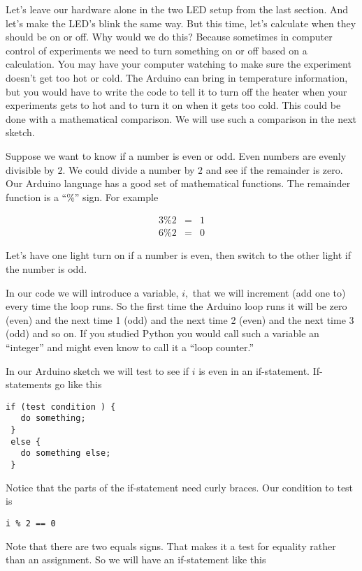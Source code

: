 Let's leave our hardware alone in the two LED setup from the last section. And let's make the LED's blink the same way. But this time, let's calculate when they should be on or off. Why would we do this? Because sometimes in computer control of experiments we need to turn something on or off based on a calculation. You may have your computer watching to make sure the experiment doesn't get too hot or cold. The Arduino can bring in temperature information, but you would have to write the code to tell it to turn off the heater when your experiments gets to hot and to turn it on when it gets too cold. This could be done with a mathematical comparison. We will use such a comparison in the next sketch.

Suppose we want to know if a number is even or odd. Even numbers are evenly divisible by $2.$ We could divide a number by $2$ and see if the remainder is zero. Our Arduino language has a good set of mathematical functions. The remainder function is a ``\%'' sign. For example 

\begin{eqnarray*}
	3\%2 &=&1 \\
	6\%2 &=&0
\end{eqnarray*}

Let's have one light turn on if a number is even, then switch to the other light if the number is odd.

In our code we will introduce a variable, $i,$ that we will increment (add one to) every time the loop runs. So the first time the Arduino loop runs it will be zero (even) and the next time 1 (odd) and the next time 2 (even) and the next time 3 (odd) and so on. If you studied Python you would call such a variable an ``integer'' and might even know to call it a ``loop counter.'' 

In our Arduino sketch we will test to see if $i$ is even in an if-statement. If-statements go like this 

\begin{lstlisting}[language=Arduino]
 if (test condition ) {
   do something;
 }
 else {
   do something else;
 }
\end{lstlisting}

Notice that the parts of the if-statement need curly braces. Our condition to test is

\begin{lstlisting}[language=Arduino]
  i % 2 == 0
\end{lstlisting}

Note that there are two equals signs. That makes it a test for equality rather than an assignment. So we will have an if-statement like this

